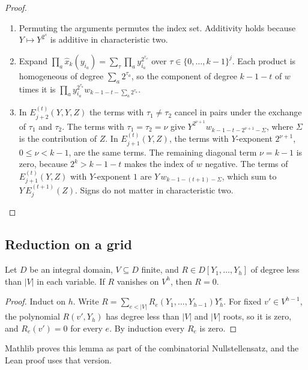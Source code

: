 \begin{proof}
\begin{enumerate}
 \item Permuting the arguments permutes the index set. Additivity holds because
 \(Y\mapsto Y^{2^s}\) is additive in characteristic two.
 \item Expand \(\prod_a\hat x_k(y_{i_a})=\sum_\tau\prod_ay_{i_a}^{2^{\tau_a}}\) over
 \(\tau\in\{0,\ldots,k-1\}^j\). Each product is homogeneous of degree
 \(\sum_a2^{\tau_a}\), so the component of degree \(k-1-t\) of \(w\) times it is
 \(\prod_ay_{i_a}^{2^{\tau_a}}w_{k-1-t-\sum_a2^{\tau_a}}\).
 \item In \(E^{(t)}_{j+2}(Y,Y,Z)\) the terms with \(\tau_1\ne\tau_2\) cancel in pairs
 under the exchange of \(\tau_1\) and \(\tau_2\). The terms with \(\tau_1=\tau_2=\nu\)
 give \(Y^{2^{\nu+1}}w_{k-1-t-2^{\nu+1}-\Sigma}\), where \(\Sigma\) is the contribution of
 \(Z\). In \(E^{(t)}_{j+1}(Y,Z)\), the terms with \(Y\)-exponent \(2^{\nu+1}\),
 \(0\le\nu<k-1\), are the same terms. The remaining diagonal term \(\nu=k-1\) is zero,
 because \(2^k>k-1-t\) makes the index of \(w\) negative. The terms of
 \(E^{(t)}_{j+1}(Y,Z)\) with \(Y\)-exponent \(1\) are
 \(Y\,w_{k-1-(t+1)-\Sigma}\), which sum to \(Y\,E^{(t+1)}_j(Z)\). Signs do not
 matter in characteristic two. \qedhere
\end{enumerate}
\end{proof}

\subsection{Reduction on a grid}

\begin{lemma}\label{lem:grid-vanishing}
Let \(D\) be an integral domain, \(V\subseteq D\) finite, and
\(R\in D[Y_1,\ldots,Y_h]\) of degree less than \(|V|\) in each variable. If \(R\)
vanishes on \(V^h\), then \(R=0\).
\end{lemma}

\begin{proof}
Induct on \(h\). Write \(R=\sum_{e<|V|}R_e(Y_1,\ldots,Y_{h-1})Y_h^e\). For fixed
\(v'\in V^{h-1}\), the polynomial \(R(v',Y_h)\) has degree less than \(|V|\) and
\(|V|\) roots, so it is zero, and \(R_e(v')=0\) for every \(e\). By induction every
\(R_e\) is zero.
\end{proof}

Mathlib proves this lemma as part of the combinatorial Nullstellensatz, and
the Lean proof uses that version.


